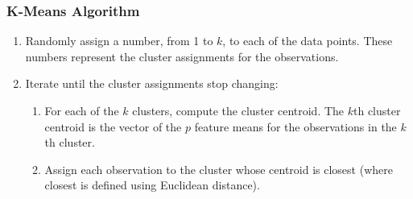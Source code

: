 \subsubsection{K-Means Algorithm}
\begin{enumerate}
    \item Randomly assign a number, from 1 to $k$, to each of the data points. These numbers represent the cluster assignments for the observations.
    \item Iterate until the cluster assignments stop changing:
    \begin{enumerate}
        \item For each of the $k$ clusters, compute the cluster centroid. The $k$th cluster centroid is the vector of the $p$ feature means for the observations in the $k$th cluster.
        \item Assign each observation to the cluster whose centroid is closest (where closest is defined using Euclidean distance).
    \end{enumerate}
\end{enumerate}
